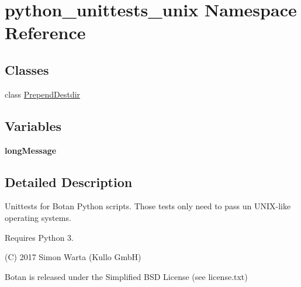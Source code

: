 \hypertarget{namespacepython__unittests__unix}{}\section{python\+\_\+unittests\+\_\+unix Namespace Reference}
\label{namespacepython__unittests__unix}
\subsection*{Classes}
\begin{DoxyCompactItemize}
\item 
class \mbox{\hyperlink{classpython__unittests__unix_1_1_prepend_destdir}{Prepend\+Destdir}}
\end{DoxyCompactItemize}
\subsection*{Variables}
\begin{DoxyCompactItemize}
\item 
\mbox{\label{namespacepython__unittests__unix_a12a0864cb92bc3eafb58b16b647a09d6}} 
{\bfseries long\+Message}
\end{DoxyCompactItemize}


\subsection{Detailed Description}
\begin{DoxyVerb}Unittests for Botan Python scripts. Those tests only need to pass un UNIX-like
operating systems.

Requires Python 3.

(C) 2017 Simon Warta (Kullo GmbH)

Botan is released under the Simplified BSD License (see license.txt)
\end{DoxyVerb}
 